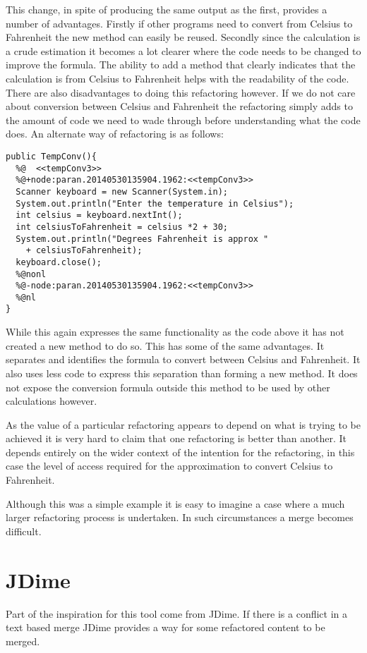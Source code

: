 This change, in spite of producing the same output as the first, provides a number of advantages. Firstly if other programs need to convert from Celsius to Fahrenheit the new method can easily be reused. Secondly since the calculation is a crude estimation it becomes a lot clearer where the code needs to be changed to improve the formula. The ability to add a method that clearly indicates that the calculation is from Celsius to Fahrenheit helps with the readability of the code. There are also disadvantages to doing this refactoring however. If we do not care about conversion between Celsius and Fahrenheit the refactoring simply adds to the amount of code we need to wade through before understanding what the code does. An alternate way of refactoring is as follows:

\begin{lstlisting}
public TempConv(){
  %@  <<tempConv3>>
  %@+node:paran.20140530135904.1962:<<tempConv3>>
  Scanner keyboard = new Scanner(System.in);
  System.out.println("Enter the temperature in Celsius");
  int celsius = keyboard.nextInt();
  int celsiusToFahrenheit = celsius *2 + 30;
  System.out.println("Degrees Fahrenheit is approx " 
    + celsiusToFahrenheit);
  keyboard.close();
  %@nonl
  %@-node:paran.20140530135904.1962:<<tempConv3>>
  %@nl
}
\end{lstlisting}

While this again expresses the same functionality as the code above it has not created a new method to do so. This has some of the same advantages. It separates and identifies the formula to convert between Celsius and Fahrenheit. It also uses less code to express this separation than forming a new method. It does not expose the conversion formula outside this method to be used by other calculations however.

As the value of a particular refactoring appears to depend on what is trying to be achieved it is very hard to claim that one refactoring is better than another. It depends entirely on the wider context of the intention for the refactoring, in this case the level of access required for the approximation to convert Celsius to Fahrenheit.

Although this was a simple example it is easy to imagine a case where a much larger refactoring process is undertaken. In such circumstances a merge becomes difficult. 

\section{JDime}
Part of the inspiration for this tool come from JDime. If there is a conflict in a text based merge JDime provides a way for some refactored content to be merged.  


